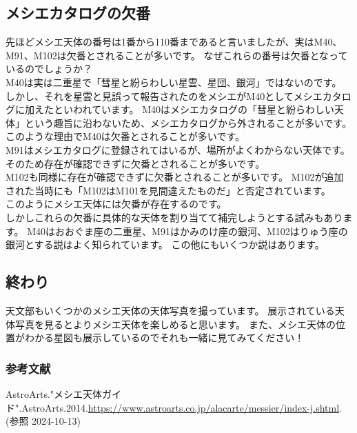 \documentclass[../main]{subfiles}
\begin{document}
\subsection*{メシエカタログの欠番}
先ほどメシエ天体の番号は1番から110番まであると言いましたが、実はM40、M91、M102は欠番とされることが多いです。
なぜこれらの番号は欠番となっているのでしょうか？\\
M40は実は二重星で「彗星と紛らわしい星雲、星団、銀河」ではないのです。
しかし、それを星雲と見誤って報告されたのをメシエがM40としてメシエカタログに加えたといわれています。
M40はメシエカタログの「彗星と紛らわしい天体」という趣旨に沿わないため、メシエカタログから外されることが多いです。
このような理由でM40は欠番とされることが多いです。
\\
M91はメシエカタログに登録されてはいるが、場所がよくわからない天体です。
そのため存在が確認できずに欠番とされることが多いです。
\\
M102も同様に存在が確認できずに欠番とされることが多いです。
M102が追加された当時にも「M102はM101を見間違えたものだ」と否定されています。
\\
このようにメシエ天体には欠番が存在するのです。
\\
しかしこれらの欠番に具体的な天体を割り当てて補完しようとする試みもあります。
M40はおおぐま座の二重星、M91はかみのけ座の銀河、M102はりゅう座の銀河とする説はよく知られています。
この他にもいくつか説はあります。

\subsection*{終わり}
天文部もいくつかのメシエ天体の天体写真を撮っています。
展示されている天体写真を見るとよりメシエ天体を楽しめると思います。
また、メシエ天体の位置がわかる星図も展示しているのでそれも一緒に見てみてください！



\subsubsection*{参考文献}
AstroArts."メシエ天体ガイド".AstroArts.2014.\url{https://www.astroarts.co.jp/alacarte/messier/index-j.shtml}.(参照 2024-10-13)
\end{document}
